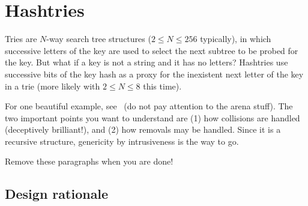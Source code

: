 \chapter{Hashtries}\label{chap:hashtries}

Tries are $N$-way search tree structures ($2\leq N \leq 256$ typically), in which successive letters of the key are used to select the next subtree to be probed for the key. But what if a key is not a string and it has no letters? Hashtries use successive bits of the key hash as a proxy for the inexistent next letter of the key in a trie (more likely with $2\leq N \leq 8$ this time). 

For one beautiful example, see~\cite{wellons:hashtree} (do not pay attention to the arena stuff). The two important points you want to understand are (1) how collisions are handled (deceptively brilliant!), and (2) how removals may be handled. Since it is a recursive structure, genericity by intrusiveness is the way to go.

Remove these paragraphs when you are done!

\section{Design rationale}


